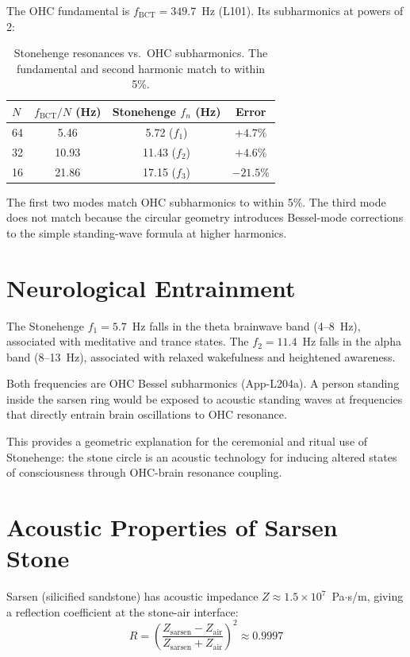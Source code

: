 \documentclass[aps,prl,twocolumn,superscriptaddress]{revtex4-2}
\begin{document}
The OHC fundamental is $f_{\mathrm{BCT}} = 349.7$~Hz (L101). Its subharmonics at powers of 2:

\begin{table}[h]
\centering
\begin{tabular}{lccc}
\hline
$N$ & $f_{\mathrm{BCT}}/N$ (Hz) & Stonehenge $f_n$ (Hz) & Error \\
\hline
64 & 5.46 & 5.72 ($f_1$) & $+4.7\%$ \\
32 & 10.93 & 11.43 ($f_2$) & $+4.6\%$ \\
16 & 21.86 & 17.15 ($f_3$) & $-21.5\%$ \\
\hline
\end{tabular}
\caption{Stonehenge resonances vs.\ OHC subharmonics. The fundamental and second harmonic match to within 5\%.}
\end{table}

The first two modes match OHC subharmonics to within 5\%. The third mode does not match because the circular geometry introduces Bessel-mode corrections to the simple standing-wave formula at higher harmonics.

\section{Neurological Entrainment}

The Stonehenge $f_1 = 5.7$~Hz falls in the theta brainwave band (4--8~Hz), associated with meditative and trance states. The $f_2 = 11.4$~Hz falls in the alpha band (8--13~Hz), associated with relaxed wakefulness and heightened awareness.

Both frequencies are OHC Bessel subharmonics (App-L204a). A person standing inside the sarsen ring would be exposed to acoustic standing waves at frequencies that directly entrain brain oscillations to OHC resonance.

This provides a geometric explanation for the ceremonial and ritual use of Stonehenge: the stone circle is an acoustic technology for inducing altered states of consciousness through OHC-brain resonance coupling.

\section{Acoustic Properties of Sarsen Stone}

Sarsen (silicified sandstone) has acoustic impedance $Z \approx 1.5 \times 10^7$~Pa$\cdot$s/m, giving a reflection coefficient at the stone-air interface:
\begin{equation}
R = \left(\frac{Z_{\mathrm{sarsen}} - Z_{\mathrm{air}}}{Z_{\mathrm{sarsen}} + Z_{\mathrm{air}}}\right)^2 \approx 0.9997
\end{equation}
\end{document}
